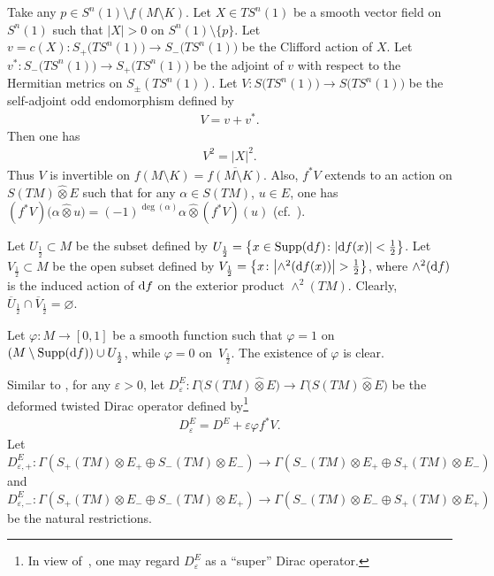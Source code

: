 \documentclass[10pt,a4paper]{amsart}
\numberwithin{equation}{section}
\theoremstyle{definition}
\begin{document}
 Take any $p\in S^n(1)\setminus {f(M\setminus K)}$. Let $X\in TS^n(1)$ be a smooth vector field on $S^n(1)$ such that $|X|>0$ on $S^n(1)\setminus \{p\}$. Let $v=c(X)\colon S_+\big(TS^n(1)\big)\rightarrow S_-\big(TS^n(1)\big)$ be the Clifford action of $X$. Let $v^*\colon S_-\big(TS^n(1)\big)\rightarrow S_+\big(TS^n(1)\big)$ be the adjoint of $v$ with respect to the Hermitian metrics on $S_\pm(TS^n(1))$. Let $V\colon S\big(TS^n(1)\big)\rightarrow S\big(TS^n(1)\big)$ be the self-adjoint odd endomorphism defined by
\begin{gather}\label{1.6}
V=v+v^*.
\end{gather}
Then one has
\begin{gather}\label{1.6a}V^2=|X|^2.
\end{gather}
Thus $V$ is invertible on $ {f(M\setminus K)} = \overline {f(M\setminus K)} $. Also, $f^*V$ extends to an action on $S(TM)\widehat\otimes E$ such that for any $\alpha\in S(TM)$, $u\in E$, one has $(f^*V )\big(\alpha\widehat \otimes u\big)=(-1)^{\deg (\alpha)}\alpha\widehat\otimes (f^*V)(u)$ (cf.~\cite{Q85}).

Let $U_{\frac{1}{2}}\subset M$ be the subset defined by
$U_{\frac{1}{2}}=\big\{ x\in \operatorname{Supp}({\rm d}f)\colon |{\rm d}f(x)|<\frac{1}{2}\big\}$. Let $V_{\frac{1}{2}}\subset M$ be the open subset defined by $V_{\frac{1}{2}}=\big\{ x \colon \big|{\wedge}^2({\rm d}f(x))\big|>\frac{1}{2}\big\}$, where $\wedge^2({\rm d}f)$ is the induced action of ${\rm d}f$ on the exterior product $\wedge^2(TM)$. Clearly, $\overline{U}_{\frac{1}{2}}\cap \overline{V}_{\frac{1}{2}}=\varnothing$.

Let $\varphi\colon M\rightarrow [0,1]$ be a smooth function such that $\varphi=1$ on $(M\setminus \operatorname{Supp}({\rm d}f) )\cup U_{\frac{1}{2}}$, while $\varphi=0$ on~$V_{\frac{1}{2}}$. The existence of $\varphi$ is clear.

Similar to \cite[equation~(1.11)]{Z19}, for any $\varepsilon>0$, let $D^E_\varepsilon\colon \Gamma\big(S(TM)\widehat\otimes E\big)\rightarrow
\Gamma\big(S(TM)\widehat\otimes E\big)$ be the deformed twisted Dirac operator defined by\footnote{In view of~\cite{Q85}, one may regard $D^E_\varepsilon$ as a ``super'' Dirac operator.}
\begin{gather}\label{1.7}
D^E_\varepsilon =D^E+\varepsilon \varphi f^*V.
\end{gather}
Let $D^E_{\varepsilon,+}\colon \Gamma(S_+(TM) \otimes E_+\oplus S_-(TM)\otimes E_-) \rightarrow \Gamma(S_-(TM) \otimes E_+\oplus S_+(TM)\otimes E_-) $ and $D^E_{\varepsilon,-}\colon \Gamma(S_+(TM) \otimes E_-\oplus S_-(TM)\otimes E_+) \rightarrow \Gamma(S_-(TM) \otimes E_-\oplus S_+(TM)\otimes E_+) $ be the natural restrictions.
\end{document}
